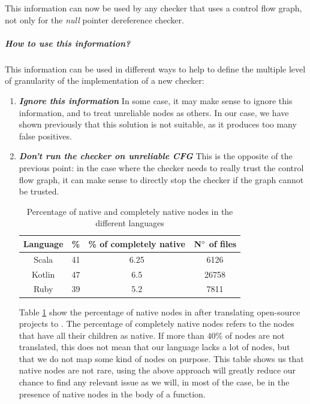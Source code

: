 This information can now be used by any checker that uses a control flow graph, not only for the \emph{null} pointer dereference checker.

\subparagraph{How to use this information?}
\label{subsubsec:use_unreliable_information}

This information can be used in different ways to help to define the multiple level of granularity of the implementation of a new checker:

\begin{enumerate}
\item \textbf{\textit{Ignore this information}} \newline
In some case, it may make sense to ignore this information, and to treat unreliable nodes as others. 
In our case, we have shown previously that this solution is not suitable, as it produces too many false positives. \newline

\item \textbf{\textit{Don’t run the checker on unreliable CFG}} \newline
This is the opposite of the previous point: in the case where the checker needs to really trust the control flow graph, it can make sense to directly stop the checker if the graph cannot be trusted.

\begin{table}[h]
	\centering
	\caption{Percentage of native and completely native nodes in the different languages}
	\label{table:slang-native-percentage}
	\begin{tabular}{|c|c|c|c|}
		\hline
		\bf Language & \bf \% & \bf \% of completely native & \bf $\bf N^{\circ}$  of files \\ \hline
		Scala &  41 &  6.25 & 6126 \\ 
		Kotlin &  47 &  6.5 & 26758 \\ 
		Ruby &  39 &  5.2 &  7811 \\ \hline
	\end{tabular}
\end{table}

Table \ref{table:slang-native-percentage} show the percentage of native nodes in \slang{} after translating open-source projects \cite{SlangSources:2019:Online} to \slang{}. The percentage of completely native nodes refers to the nodes that have all their children as native. If more than $40\%$ of nodes are not translated, this does not mean that our language lacks a lot of nodes, but that we do not map some kind of nodes on purpose.
This table shows us that native nodes are not rare, using the above approach will greatly reduce our chance to find any relevant issue as we will, in most of the case, be in the presence of native nodes in the body of a function.


\end{enumerate}
